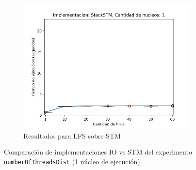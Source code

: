 \begin{appendices}
\begin{figure}[t]
\begin{subfigure}[b]{0.49\textwidth}
        \includegraphics[width=\textwidth]{images/numberOfThreadsDist/plots/expStackSTM-1}
        \caption{Resultados para LFS sobre STM}
        \label{subfig:numberOfThreadsDist-stackstm-1}
    \end{subfigure}
    \caption{Comparación de implementaciones IO vs STM del experimento \texttt{numberOfThreadsDist} (1 núcleo de ejecución)}
    \label{fig:numberOfThreadsDist-boxplots-1}
\end{figure}


\end{appendices}
